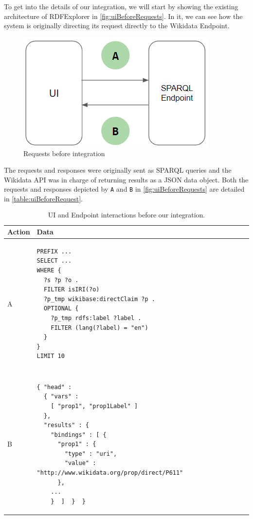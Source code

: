 To get into the details of our integration, we will start by showing the existing architecture of RDFExplorer in \autoref{fig:uiBeforeRequests}. In it, we can see how the system is originally directing its request directly to the Wikidata Endpoint. 

\begin{figure}[H]
    \centering
        \includegraphics[width=0.55\linewidth]{imagenes/uiBeforeRequest.png}
        \caption{Requests before integration}
        \label{fig:uiBeforeRequests}
\end{figure}

The requests and responses were originally sent as SPARQL queries and the Wikidata API was in charge of returning results as a JSON data object. Both the requests and responses depicted by \texttt{A} and \texttt{B} in \autoref{fig:uiBeforeRequests} are detailed in \autoref{table:uiBeforeRequest}.

\begin{table}[h]
\centering
\begin{tabular}{ll}
Action & Data \\ 
\hline
A              
& \begin{minipage}[t]{0.85\linewidth}
\begin{verbatim}
PREFIX ...
SELECT ... 
WHERE {
  ?s ?p ?o .
  FILTER isIRI(?o)
  ?p_tmp wikibase:directClaim ?p .
  OPTIONAL {
    ?p_tmp rdfs:label ?label .
    FILTER (lang(?label) = "en")
  } 
} 
LIMIT 10
\end{verbatim}
\end{minipage}
\\ \\ \\
B             
& \begin{minipage}[t]{0.85\linewidth}
\begin{verbatim}
{ "head" : 
  { "vars" : 
    [ "prop1", "prop1Label" ] 
  },
  "results" : {
    "bindings" : [ {
      "prop1" : {
        "type" : "uri",
        "value" : "http://www.wikidata.org/prop/direct/P611"
      }, 
    ...
    }  ]  }  }
\end{verbatim}
\end{minipage}
\\
\end{tabular}
\caption{UI and Endpoint interactions before our integration.}
\label{table:uiBeforeRequest}
\end{table}

